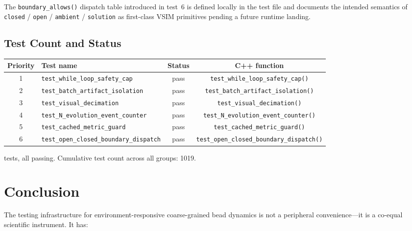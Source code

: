 \documentclass[11pt]{article}
\newcommand{\fn}[1]{\texttt{#1}}
\begin{document}
\noindent The \texttt{boundary\_allows()} dispatch table introduced in
test~6 is defined locally in the test file and documents the intended
semantics of \texttt{closed} / \texttt{open} / \texttt{ambient} /
\texttt{solution} as first-class VSIM primitives pending a future runtime
landing.

\subsection{Test Count and Status}

\begin{center}
\begin{tabular}{@{}clcc@{}}
\toprule
\textbf{Priority} & \textbf{Test name} & \textbf{Status} & \textbf{C++ function} \\
\midrule
1 & \texttt{test\_while\_loop\_safety\_cap}     & pass & \fn{test\_while\_loop\_safety\_cap()} \\
2 & \texttt{test\_batch\_artifact\_isolation}   & pass & \fn{test\_batch\_artifact\_isolation()} \\
3 & \texttt{test\_visual\_decimation}           & pass & \fn{test\_visual\_decimation()} \\
4 & \texttt{test\_N\_evolution\_event\_counter} & pass & \fn{test\_N\_evolution\_event\_counter()} \\
5 & \texttt{test\_cached\_metric\_guard}        & pass & \fn{test\_cached\_metric\_guard()} \\
6 & \texttt{test\_open\_closed\_boundary\_dispatch} & pass & \fn{test\_open\_closed\_boundary\_dispatch()} \\
\bottomrule
\end{tabular}
\end{center}

 tests, all passing.  Cumulative test count across all groups:
1019.

\section{Conclusion}

The testing infrastructure for environment-responsive coarse-grained bead
dynamics is not a peripheral convenience---it is a co-equal scientific
instrument.  It has:
\end{document}
